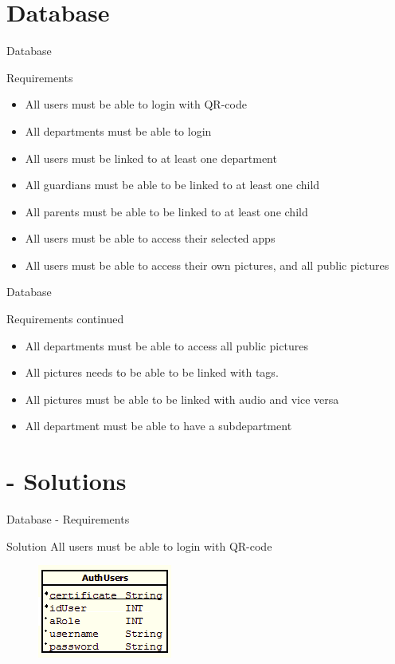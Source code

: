 \section{Database}
\begin{frame}{Database}
\pause
    \begin{block}{Requirements}
        \begin{itemize}
					\pause \item All users must be able to login with QR-code
					\pause \item All departments must be able to login
					\pause \item All users must be linked to at least one department
					\pause \item All guardians must be able to be linked to at least one child
					\pause \item All parents must be able to be linked to at least one child
					\pause \item All users must be able to access their selected apps
					\pause \item All users must be able to access their own pictures, and all public pictures
				\end{itemize}
    \end{block}
\end{frame}
\begin{frame}{Database}
    \begin{block}{Requirements continued}
        \begin{itemize}
					\pause \item All departments must be able to access all public pictures
					\pause \item All pictures needs to be able to be linked with tags.
					\pause \item All pictures must be able to be linked with audio and vice versa
					\pause \item All department must be able to have a subdepartment
				\end{itemize}
    \end{block}
\end{frame}

\section{ - Solutions}
\begin{frame}{Database - Requirements}
    \begin{block}{Solution}
					All users must be able to login with QR-code
					
\begin{figure}[h]
	\centering
		\includegraphics{Img/DatabaseQR.png}
\end{figure}

    \end{block}
\end{frame}

